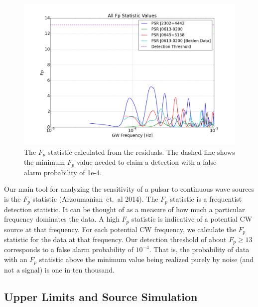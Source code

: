 \documentclass[12pt]{article}
\begin{document}
\begin{figure}[h!]
\caption{The $F_p$ statistic calculated from the residuals. The dashed line shows
    the minimum $F_p$ value needed to claim a detection with a false alarm probability
    of 1e-4.}
\includegraphics[width=\textwidth]{./figures/both_fp_presentation.png}
\end{figure}

    Our main tool for analyzing the sensitivity of a pulsar to continuous wave
sources is the $F_p$ statistic (Arzoumanian~et.~al
2014). The
$F_p$ statistic is a frequentist detection statistic. It can be thought of as a
measure of how much a particular frequency dominates the data. A high $F_p$
statistic is indicative of a potential CW source at that frequency. For each
potential CW frequency, we calculate the $F_p$ statistic for the data at that
frequency. Our detection threshold of about $F_p \geq 13$ corresponds to a false
alarm probability of $10^{-4}$. That is, the probability of data with an $F_p$
statistic above the minimum value being realized purely by noise (and not a
signal) is one in ten thousand.

\subsection{Upper Limits and Source Simulation}
\end{document}
